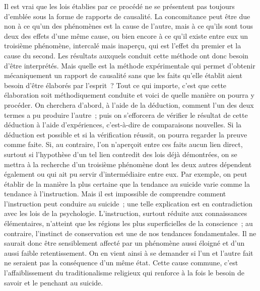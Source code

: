 \documentclass[french,twoside]{book} %
\begin{document}
Il est vrai que les lois établies par ce procédé ne se présentent pas toujours d’emblée sous la forme de rapports de causalité. La concomitance peut être due non à ce qu’un des phénomènes est la cause de l’autre, mais à ce qu’ils sont tous deux des effets d’une même cause, ou bien encore à ce qu’il existe entre eux un troisième phénomène, intercalé mais inaperçu, qui est l’effet du premier et la cause du second. Les résultats auxquels conduit cette méthode ont donc besoin d’être interprétés. Mais quelle est la méthode expérimentale qui permet d’obtenir mécaniquement un rapport de causalité sans que les faits qu’elle établit aient besoin d’être élaborés par l’esprit ? Tout ce qui importe, c’est que cette élaboration soit méthodiquement conduite et voici de quelle manière on pourra y procéder. On cherchera d’abord, à l’aide de la déduction, comment l’un des deux termes a pu produire l’autre ; puis on s’efforcera de vérifier le résultat de cette déduction à l’aide d’expériences, c’est-à-dire de comparaisons nouvelles. Si la déduction est possible et si la vérification réussit, on pourra regarder la preuve comme faite. Si, au contraire, l’on n’aperçoit entre ces faits aucun lien direct, surtout si l’hypothèse d’un tel lien contredit des lois déjà démontrées, on se mettra à la recherche d’un troisième phénomène dont les deux autres dépendent également ou qui ait pu servir d’intermédiaire entre eux. Par exemple, on peut établir de la manière la plus certaine que la tendance au suicide varie comme la tendance à l’instruction. Mais il est impossible de comprendre comment l’instruction peut conduire au suicide ; une telle explication est en contradiction avec les lois de la psychologie. L’instruction, surtout réduite aux connaissances élémentaires, n’atteint que les régions les plus superficielles de la conscience ; au contraire, l’instinct de conservation est une de nos tendances fondamentales. Il ne saurait donc être sensiblement affecté par un phénomène aussi éloigné et d’un aussi faible retentissement. On en vient ainsi à se demander si l’un et l’autre fait ne seraient pas la conséquence d’un même état. Cette cause commune, c’est l’affaiblissement du traditionalisme religieux qui renforce à la fois le besoin de savoir et le penchant au suicide.\par
\end{document}
